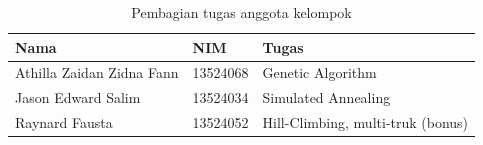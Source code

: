 \begin{table}[H]
	\centering
	\caption{Pembagian tugas anggota kelompok}
	\label{tab:pembagian}
	\begin{tabular}{l l l}
		\toprule
		\textbf{Nama} & \textbf{NIM} & \textbf{Tugas} \\
		\midrule
		Athilla Zaidan Zidna Fann & 13524068 & Genetic Algorithm \\
		Jason Edward Salim & 13524034 & Simulated Annealing \\
		Raynard Fausta & 13524052 & Hill-Climbing, multi-truk (bonus) \\
		\bottomrule
	\end{tabular}
\end{table}
